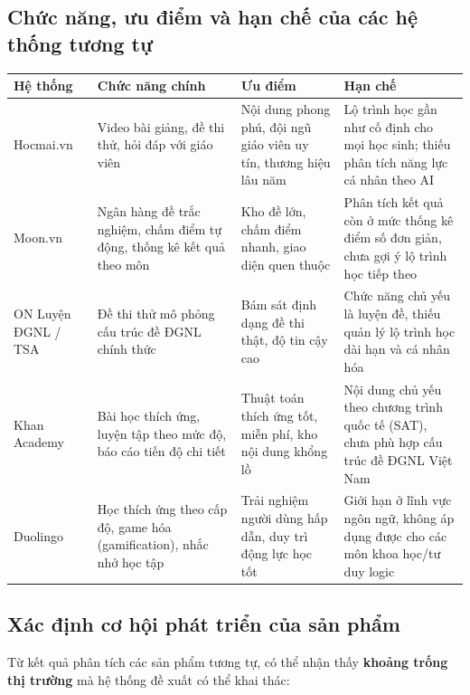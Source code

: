 \documentclass[12pt,a4paper]{article}
\begin{document}
	\subsection{Chức năng, ưu điểm và hạn chế của các hệ thống tương tự}
	
	\begin{longtable}{p{2.6cm}p{4.7cm}p{4.1cm}p{4.1cm}}
		\toprule
		\rowcolor{blue!15}
		\textbf{Hệ thống} & \textbf{Chức năng chính} & \textbf{Ưu điểm} & \textbf{Hạn chế} \\
		\midrule
		\endhead
		Hocmai.vn &
		Video bài giảng, đề thi thử, hỏi đáp với giáo viên &
		Nội dung phong phú, đội ngũ giáo viên uy tín, thương hiệu lâu năm &
		Lộ trình học gần như cố định cho mọi học sinh; thiếu phân tích năng lực cá nhân theo AI \\
		\addlinespace
		Moon.vn &
		Ngân hàng đề trắc nghiệm, chấm điểm tự động, thống kê kết quả theo môn &
		Kho đề lớn, chấm điểm nhanh, giao diện quen thuộc &
		Phân tích kết quả còn ở mức thống kê điểm số đơn giản, chưa gợi ý lộ trình học tiếp theo \\
		\addlinespace
		ON Luyện ĐGNL / TSA &
		Đề thi thử mô phỏng cấu trúc đề ĐGNL chính thức &
		Bám sát định dạng đề thi thật, độ tin cậy cao &
		Chức năng chủ yếu là luyện đề, thiếu quản lý lộ trình học dài hạn và cá nhân hóa \\
		\addlinespace
		Khan Academy &
		Bài học thích ứng, luyện tập theo mức độ, báo cáo tiến độ chi tiết &
		Thuật toán thích ứng tốt, miễn phí, kho nội dung khổng lồ &
		Nội dung chủ yếu theo chương trình quốc tế (SAT), chưa phù hợp cấu trúc đề ĐGNL Việt Nam \\
		\addlinespace
		Duolingo &
		Học thích ứng theo cấp độ, game hóa (gamification), nhắc nhở học tập &
		Trải nghiệm người dùng hấp dẫn, duy trì động lực học tốt &
		Giới hạn ở lĩnh vực ngôn ngữ, không áp dụng được cho các môn khoa học/tư duy logic \\
		\bottomrule
	\end{longtable}
	
	\subsection{Xác định cơ hội phát triển của sản phẩm}
	
	Từ kết quả phân tích các sản phẩm tương tự, có thể nhận thấy \textbf{khoảng trống thị trường} mà hệ thống đề xuất có thể khai thác:
	
\end{document}
